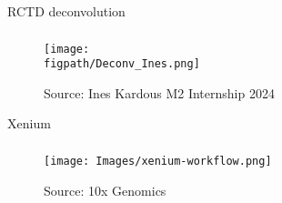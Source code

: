 \documentclass[aspectratio=169]{beamer}
\newcommand{\figpath}{/mnt/datadisk/Jordan/Delivrables/Rapports/Rapport_stage/Figures/Sans_légendes}
\begin{document}
\begin{frame}{RCTD deconvolution}
    \frametitle<presentation>{}
    
    \begin{figure}[h]
        \begin{minipage}{0.65\textwidth}
            \raggedleft
            \texttt{[image: \\figpath/Deconv\_Ines.png]}
        \end{minipage}

        \hfill

        \begin{minipage}{0.48\textwidth}
            \raggedleft
            \tiny \color{gray} Source: Ines Kardous M2 Internship 2024 
        \end{minipage}
    \end{figure}
\end{frame}

\begin{frame}{Xenium}
    \frametitle<presentation>{}
    
    \begin{figure}[h]
        \begin{minipage}{0.65\textwidth}
            \raggedleft
            \texttt{[image: Images/xenium-workflow.png]}
        \end{minipage}

        \hfill

        \begin{minipage}{0.48\textwidth}
            \raggedleft
            \tiny \color{gray} Source: 10x Genomics 
        \end{minipage}
    \end{figure}
\end{frame}
\end{document}
